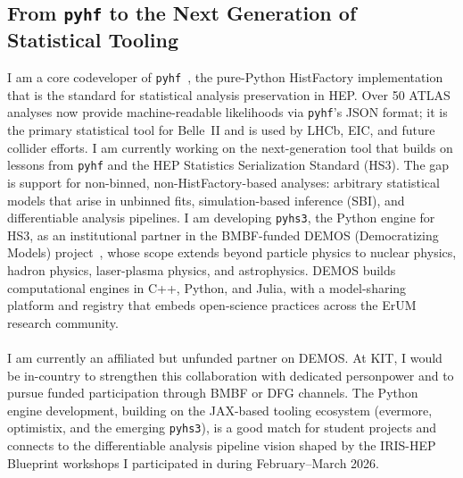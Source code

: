 \documentclass[10pt,a4paper,sans]{moderncv} %
\begin{document}
\subsection{From \texttt{pyhf} to the Next Generation of Statistical Tooling}
I am a core codeveloper of \texttt{pyhf}~\cite{Heinrich2021}, the pure-Python HistFactory implementation that is the standard for statistical analysis preservation in HEP. Over 50 ATLAS analyses now provide machine-readable likelihoods via \texttt{pyhf}'s JSON format; it is the primary statistical tool for Belle~II and is used by LHCb, EIC, and future collider efforts. I am currently working on the next-generation tool that builds on lessons from \texttt{pyhf} and the HEP Statistics Serialization Standard (HS3). The gap is support for non-binned, non-HistFactory-based analyses: arbitrary statistical models that arise in unbinned fits, simulation-based inference (SBI), and differentiable analysis pipelines. I am developing \texttt{pyhs3}, the Python engine for HS3, as an institutional partner in the BMBF-funded DEMOS (Democratizing Models) project~\cite{DEMOS2025}, whose scope extends beyond particle physics to nuclear physics, hadron physics, laser-plasma physics, and astrophysics. DEMOS builds computational engines in C++, Python, and Julia, with a model-sharing platform and registry that embeds open-science practices across the ErUM research community.
\\
\\
I am currently an affiliated but unfunded partner on DEMOS. At KIT, I would be in-country to strengthen this collaboration with dedicated personpower and to pursue funded participation through BMBF or DFG channels. The Python engine development, building on the JAX-based tooling ecosystem (evermore, optimistix, and the emerging \texttt{pyhs3}), is a good match for student projects and connects to the differentiable analysis pipeline vision shaped by the IRIS-HEP Blueprint workshops I participated in during February--March 2026.
\end{document}
